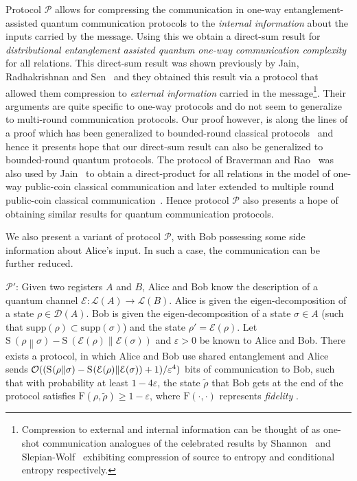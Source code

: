 \documentclass[11pt,a4paper]{article}
\def\F{\mathrn{F}}
\def\O{\CMcal{O}}
\theoremstyle{plain}
\theoremstyle{definition}
\newcommand {\br} [1] {\ensuremath{ \left( #1 \right) }}
\newcommand {\minusspace} {\: \! \!}
\newcommand {\fn} [2] {\ensuremath{ #1 \minusspace \br{ #2 } }}
\newcommand {\relent} [2] {\fn{\mathrm{S}}{#1 \middle\| #2}}
\newcommand {\Prot}{\mathcal{P}}
\def\ve{{\varepsilon}}
\def\F{\mathrm{F}}
\def\E{\mathcal{E}}
\begin{document}
Protocol $\Prot$ allows for compressing the communication in one-way entanglement-assisted quantum communication protocols to the {\em internal information} about the inputs carried by the message. Using this we obtain a direct-sum result for {\em distributional entanglement assisted quantum one-way communication complexity} for all relations. This direct-sum result was shown previously by Jain, Radhakrishnan and Sen~\cite{Jain:2005:PEM:1068502.1068658,Jain:2008} and they obtained this result via a protocol that allowed them compression to {\em external information} carried in the message\footnote{Compression to external and internal information can be thought of as one-shot communication analogues of the celebrated results by Shannon~\cite{Shannon:1948} and Slepian-Wolf~\cite{Slepian:1973} exhibiting compression of source to entropy and conditional entropy respectively.}. Their arguments are quite specific to one-way protocols and  do not seem to generalize to multi-round communication protocols. Our proof however, is along the lines of a proof which has been generalized to bounded-round classical protocols~\cite{Braverman2011} and hence it presents hope that our direct-sum result can also be generalized to  bounded-round quantum protocols. The protocol of Braverman and Rao~\cite{Braverman2011} was also used by Jain~\cite{Jain:2011} to obtain a direct-product for all relations in the model of one-way public-coin classical communication  and later extended to multiple round  public-coin classical communication~\cite{Jain:2012,BravermanRWY:2013}. Hence  protocol $\Prot$ also presents a hope of obtaining similar results for quantum communication protocols.


We also present a variant of protocol $\Prot$, with Bob possessing some side information about Alice's input. In such a case, the communication can be further reduced. 

\bigskip 

\noindent $\Prot'$: Given two registers $A$ and $B$, Alice and Bob know the description of a quantum channel $\E: \mathcal{L}(A)\rightarrow \mathcal{L}(B)$. Alice is given the eigen-decomposition of a state $\rho \in \mathcal{D}(A)$. Bob is given the eigen-decomposition of a state $\sigma \in A$ (such that $\text{supp}(\rho) \subset \text{supp}(\sigma)$) and the state $\rho'= \E(\rho)$. Let  $\relent{\rho}{\sigma}-\relent{\E(\rho)}{\E(\sigma)}$ and $\ve >0$ be known to Alice and Bob. There exists a protocol, in which Alice and Bob use shared entanglement and Alice sends $\O((\relent{\rho}{\sigma}-\relent{\E(\rho)}{\E(\sigma)}+1)/\ve^4)$ bits of communication to Bob, such that with probability at least $1-4\ve$, the state $\tilde{\rho}$ that Bob gets at the end of the protocol satisfies  $\F(\rho,\tilde{\rho})\geq 1-\ve$, where $\F(\cdot,\cdot)$ represents {\em fidelity} .
\end{document}
